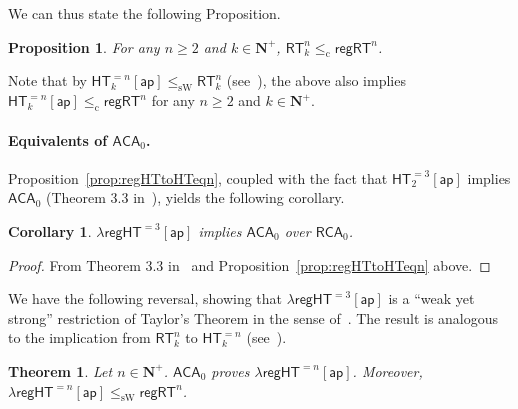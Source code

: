 \documentclass[a4paper,11pt]{article}
\newtheorem{proposition}{Proposition}
\newtheorem{theorem}{Theorem}
\newtheorem{corollary}{Corollary}
\newcommand\Nat{\mathbf{N}}
\newcommand\RCA{\mathsf{RCA}}
\newcommand\ACA{\mathsf{ACA}}
\newcommand\HT{\mathsf{HT}}
\newcommand\RT{\mathsf{RT}}
\newcommand\regHT{\mathsf{regHT}}
\newcommand\REG{\mathsf{regRT}}
\newcommand\compred{\mathrm{c}}
\newcommand\sW{\mathrm{sW}}
\newcommand\ap{\mathsf{ap}}
\begin{document}
We can thus state the following Proposition. 

\begin{proposition}\label{prop:regrt}
For any $n\geq 2$ and $k\in\Nat^+$, $\RT^n_k \leq_{\compred} \REG^n$.
\end{proposition}

Note that by $\HT^{=n}_k[\ap] \leq_\sW \RT^n_k$ (see~\cite{Car-Kol-Lep-Zda:20}), the above also implies $\HT^{=n}_k[\ap] \leq_{\compred} \REG^n$ for any $n \geq 2$ and $k \in \Nat^+$. 


\paragraph{Equivalents of $\ACA_0$.}

Proposition~\ref{prop:regHTtoHTeqn}, coupled with the fact that $\HT^{=3}_2[\ap]$ implies $\ACA_0$ (Theorem 3.3 in~\cite{Car-Kol-Lep-Zda:20}), yields the following corollary.

\begin{corollary}
$\lambda\regHT^{=3}[\ap]$ implies $\ACA_0$ over $\RCA_0$.
\end{corollary}

\begin{proof}
From Theorem 3.3 in~\cite{Car-Kol-Lep-Zda:20} and Proposition~\ref{prop:regHTtoHTeqn} above.
\end{proof}

We have the following reversal, showing that $\lambda\regHT^{= 3}[\ap]$ is a ``weak yet strong'' restriction of Taylor's Theorem in the sense of~\cite{Car:16:wys}.
The result is analogous to the implication from $\RT^n_k$ to $\HT^{=n}_k$ (see~\cite{Car-Kol-Lep-Zda:20}).


\begin{theorem}\label{thm:acareght}
Let $n\in\Nat^+$. $\ACA_0$ proves $\lambda\regHT^{= n}[\ap]$.
Moreover, $\lambda\regHT^{= n}[\ap] \leq_{\mathrm{\sW}} \REG^n$.
\end{theorem}
\end{document}
